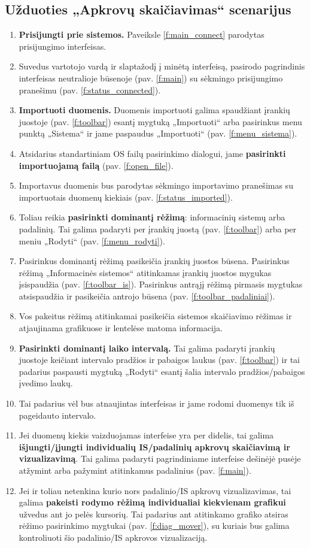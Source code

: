 \subsection{Užduoties „Apkrovų skaičiavimas“ scenarijus}
\begin{enumerate}
  \item \textbf{Prisijungti prie sistemos.} Paveiksle \ref{f:main_connect} parodytas prisijungimo
  interfeisas.
  \item Suvedus vartotojo vardą ir slaptažodį į minėtą interfeisą, pasirodo pagrindinis interfeisas neutralioje būsenoje (pav. \ref{f:main}) su sėkmingo prisijungimo pranešimu (pav. \ref{f:status_connected}).
  \item \textbf{Importuoti duomenis.} Duomenis importuoti galima spaudžiant įrankių juostoje (pav. \ref{f:toolbar}) esantį mygtuką „Importuoti“ arba pasirinkus menu punktą „Sistema“ ir jame paspaudus „Importuoti“ (pav. \ref{f:menu_sistema}).
  \item Atsidarius standartiniam OS failų pasirinkimo dialogui, jame \textbf{pasirinkti importuojamą failą} (pav. \ref{f:open_file}).
  \item Importavus duomenis bus parodytas sėkmingo importavimo pranešimas su importuotais duomenų kiekiais (pav. \ref{f:status_imported}).
  \item Toliau reikia \textbf{pasirinkti dominantį rėžimą}: informacinių sistemų arba padalinių. Tai galima padaryti per įrankių juostą (pav. \ref{f:toolbar}) arba per meniu „Rodyti“ (pav. \ref{f:menu_rodyti}).
  \item Pasirinkus dominantį rėžimą pasikeičia įrankių juostos būsena. Pasirinkus rėžimą „Informacinės sistemos“ atitinkamas įrankių juostos mygukas įsispaudžia (pav. \ref{f:toolbar_is}). Pasirinkus antrąjį rėžimą pirmasis mygtukas atsispaudžia ir pasikeičia antrojo būsena (pav. \ref{f:toolbar_padaliniai}).
  \item Vos pakeitus rėžimą atitinkamai pasikeičia sistemos skaičiavimo rėžimas ir atjaujinama grafikuose ir lentelėse matoma informacija.
  \item \textbf{Pasirinkti dominantį laiko intervalą.} Tai galima padaryti įrankių juostoje keičiant intervalo pradžios ir pabaigos laukus (pav. \ref{f:toolbar}) ir tai padarius paspausti mygtuką „Rodyti“ esantį šalia intervalo pradžios/pabaigos įvedimo laukų.
  \item Tai padarius vėl bus atnaujintas interfeisas ir jame rodomi duomenys tik iš pageidauto intervalo.
  \item Jei duomenų kiekis vaizduojamas interfeise yra per didelis, tai galima \textbf{išjungti/įjungti individualių IS/padalinių apkrovų skaičiavimą ir vizualizavimą}. Tai galima padaryti pagrindiniame interfeise dešinėjė pusėje atžymint arba pažymint atitinkamus padalinius (pav. \ref{f:main}).
  \item Jei ir toliau netenkina kurio nors padalinio/IS apkrovų vizualizavimas, tai galima \textbf{pakeisti rodymo rėžimą individualiai kiekvienam grafikui} užvedus ant jo pelės kursorių. Tai padarius ant atitinkamo grafiko atsiras rėžimo pasirinkimo mygtukai (pav. \ref{f:diag_mover}), su kuriais bus galima kontroliuoti šio padalinio/IS apkrovos vizualizaciją.
\end{enumerate}

